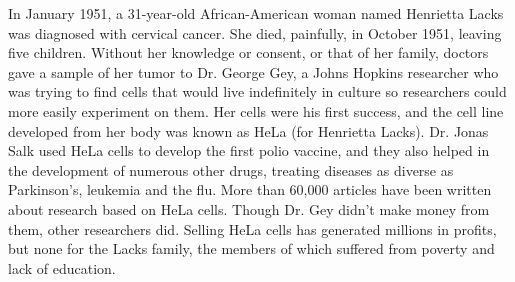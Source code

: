 \item In January 1951, a 31-year-old African-American woman named Henrietta
Lacks
was diagnosed with cervical cancer.  She died, painfully, in October 1951,
leaving five children.  Without her knowledge or consent, or that of her
family, doctors gave a sample of her tumor to Dr. George Gey, a Johns Hopkins
researcher who was trying to find cells that would live indefinitely in culture
so researchers could more easily experiment on them.  Her cells were his first
success, and the cell line developed from her body was known as HeLa (for
Henrietta Lacks).  Dr. Jonas Salk used HeLa cells to develop the first polio
vaccine, and they also helped in the development of numerous other drugs,
treating diseases as diverse as Parkinson's, leukemia and the flu. More than
60,000 articles have been written about research based on HeLa cells.  Though
Dr. Gey didn't make money from them, other researchers did.  Selling HeLa cells
has generated millions in profits, but none for the Lacks family, the members
of which suffered from poverty and lack of education.

